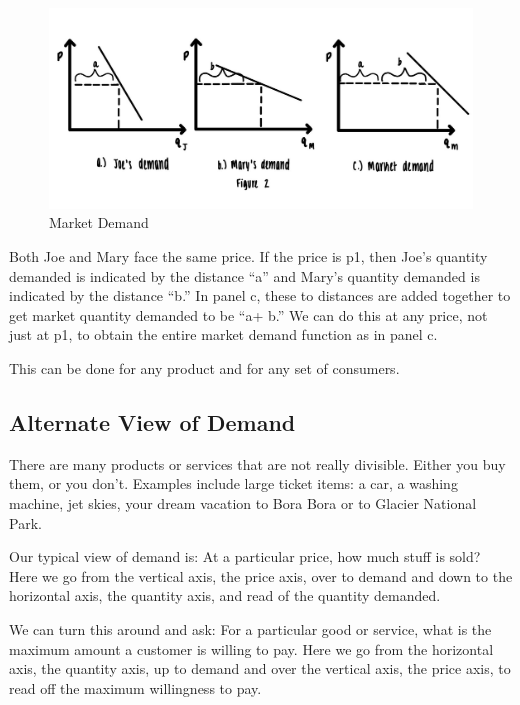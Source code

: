 \documentclass[
]{book}
\begin{document}
\begin{figure}

{\centering \includegraphics[width=1\linewidth]{img/ch3/fig3} 

}

\caption{Market Demand}\label{fig:fig303}
\end{figure}

Both Joe and Mary face the same price. If the price is p1, then Joe's quantity demanded is indicated by the distance ``a'' and Mary's quantity demanded is indicated by the distance ``b.'' In panel c, these to distances are added together to get market quantity demanded to be ``a+ b.'' We can do this at any price, not just at p1, to obtain the entire market demand function as in panel c.

This can be done for any product and for any set of consumers.

\hypertarget{alternate-view-of-demand}{%
\subsection{Alternate View of Demand}\label{alternate-view-of-demand}}

There are many products or services that are not really divisible. Either you buy them, or you don't. Examples include large ticket items: a car, a washing machine, jet skies, your dream vacation to Bora Bora or to Glacier National Park.

Our typical view of demand is: At a particular price, how much stuff is sold? Here we go from the vertical axis, the price axis, over to demand and down to the horizontal axis, the quantity axis, and read of the quantity demanded.

We can turn this around and ask: For a particular good or service, what is the maximum amount a customer is willing to pay. Here we go from the horizontal axis, the quantity axis, up to demand and over the vertical axis, the price axis, to read off the maximum willingness to pay.
\end{document}
